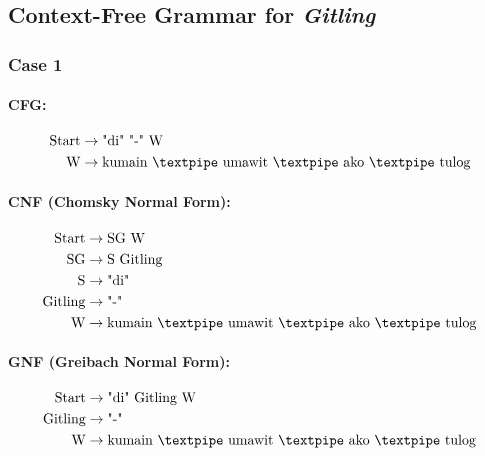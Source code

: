 \subsection{Context-Free Grammar for \textit{Gitling}}

\subsubsection{Case 1}

\paragraph{CFG:}

\begin{equation*}
    \begin{aligned}
        \text{Start}  & \rightarrow \text{"di" "-" W}   \\
        \text{W} & \rightarrow \text{kumain {\textpipe} umawit {\textpipe} ako {\textpipe} tulog}   \\
    \end{aligned}
\end{equation*}

\paragraph{CNF (Chomsky Normal Form):}

\begin{equation*}
    \begin{aligned}
        \text{Start}   & \rightarrow \text{SG W} \\
        \text{SG}      & \rightarrow \text{S Gitling}\\
        \text{S}    & \rightarrow \text{"di"}\\        
        \text{Gitling} & \rightarrow \text{"-"}\\
        \text{W} & \rightarrow \text{kumain {\textpipe} umawit {\textpipe} ako {\textpipe} tulog}   \\
    \end{aligned}
\end{equation*}

\paragraph{GNF (Greibach Normal Form):}

\begin{equation*}
    \begin{aligned}
        \text{Start}   & \rightarrow \text{"di" Gitling W}\\
        \text{Gitling} & \rightarrow \text{"-"}\\
        \text{W} & \rightarrow \text{kumain {\textpipe} umawit {\textpipe} ako {\textpipe} tulog}   \\
    \end{aligned}
\end{equation*}

